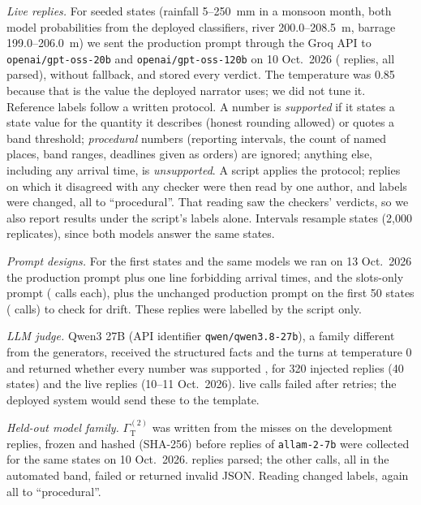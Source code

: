 \documentclass[conference]{IEEEtran}
\begin{document}
\textit{Live replies.} For \LiveStates{} seeded states (rainfall 5--250~mm in a monsoon month, both model probabilities from the deployed classifiers, river 200.0--208.5~m, barrage 199.0--206.0~m) we sent the production prompt through the Groq API to \texttt{openai/gpt-oss-20b} and \texttt{openai/gpt-oss-120b} on 10 Oct.\ 2026 (\LiveN{} replies, all parsed), without fallback, and stored every verdict. The temperature was 0.85 because that is the value the deployed narrator uses; we did not tune it. Reference labels follow a written protocol. A number is \emph{supported} if it states a state value for the quantity it describes (honest rounding allowed) or quotes a band threshold; \emph{procedural} numbers (reporting intervals, the count of named places, band ranges, deadlines given as orders) are ignored; anything else, including any arrival time, is \emph{unsupported}. A script applies the protocol; replies on which it disagreed with any checker were then read by one author, and \LiveOverrides{} labels were changed, all to ``procedural''. That reading saw the checkers' verdicts, so we also report results under the script's labels alone. Intervals resample states (2,000 replicates), since both models answer the same states.

\textit{Prompt designs.} For the first \VarStates{} states and the same models we ran on 13 Oct.\ 2026 the production prompt plus one line forbidding arrival times, and the slots-only prompt (\VarN{} calls each), plus the unchanged production prompt on the first 50 states (\VarBaseN{} calls) to check for drift. These replies were labelled by the script only.

\textit{LLM judge.} Qwen3 27B (API identifier \texttt{qwen/qwen3.8-27b}), a family different from the generators, received the structured facts and the turns at temperature 0 and returned whether every number was supported \cite{Zheng2023}, for 320 injected replies (40 states) and the \LiveN{} live replies (10--11 Oct.\ 2026). \JudFailN{} live calls failed after retries; the deployed system would send these to the template.

\textit{Held-out model family.} $\Gamma_{\mathrm{T}}^{(2)}$ was written from the misses on the development replies, frozen and hashed (SHA-256) before replies of \texttt{allam-2-7b} were collected for the same \HoStates{} states on 10 Oct.\ 2026. \HoN{} replies parsed; the other \HoParseFail{} calls, all in the automated band, failed or returned invalid JSON. Reading changed \HoOverrides{} labels, again all to ``procedural''.
\end{document}
